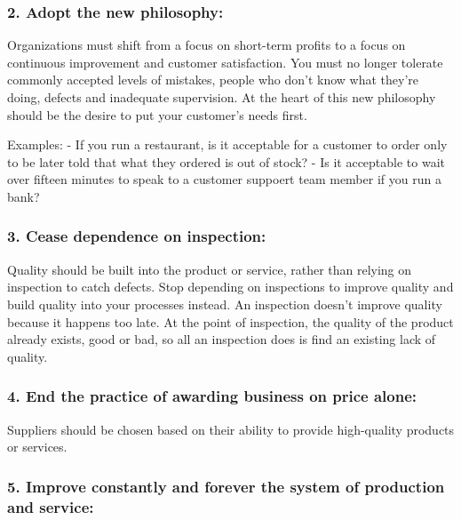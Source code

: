 \documentclass[11pt]{article}
\begin{document}
\hypertarget{adopt-the-new-philosophy}{%
\subsubsection{2. Adopt the new
philosophy:}\label{adopt-the-new-philosophy}}

Organizations must shift from a focus on short-term profits to a focus
on continuous improvement and customer satisfaction. You must no longer
tolerate commonly accepted levels of mistakes, people who don't know
what they're doing, defects and inadequate supervision. At the heart of
this new philosophy should be the desire to put your customer's needs
first.

Examples: - If you run a restaurant, is it acceptable for a customer to
order only to be later told that what they ordered is out of stock? - Is
it acceptable to wait over fifteen minutes to speak to a customer
suppoert team member if you run a bank?

\hypertarget{cease-dependence-on-inspection}{%
\subsubsection{3. Cease dependence on
inspection:}\label{cease-dependence-on-inspection}}

Quality should be built into the product or service, rather than relying
on inspection to catch defects. Stop depending on inspections to improve
quality and build quality into your processes instead. An inspection
doesn't improve quality because it happens too late. At the point of
inspection, the quality of the product already exists, good or bad, so
all an inspection does is find an existing lack of quality.

\hypertarget{end-the-practice-of-awarding-business-on-price-alone}{%
\subsubsection{4. End the practice of awarding business on price
alone:}\label{end-the-practice-of-awarding-business-on-price-alone}}

Suppliers should be chosen based on their ability to provide
high-quality products or services.

\hypertarget{improve-constantly-and-forever-the-system-of-production-and-service}{%
\subsubsection{5. Improve constantly and forever the system of
production and
service:}\label{improve-constantly-and-forever-the-system-of-production-and-service}}
\end{document}
